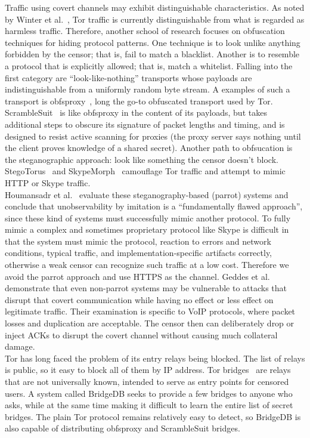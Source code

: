 \documentclass{article}
\begin{document}
Traffic using covert channels may exhibit distinguishable characteristics. As
noted by Winter et al.~\cite{foci12-winter}, Tor traffic is currently
distinguishable from what is regarded as harmless traffic. Therefore, another
school of research focuses on obfuscation techniques for hiding protocol
patterns. One technique is to look unlike anything forbidden by the censor; that
is, fail to match a blacklist. Another is to resemble a protocol that is
explicitly allowed; that is, match a whitelist. Falling into the first category
are ``look-like-nothing'' transports whose payloads are indistinguishable from a
uniformly random byte stream. A examples of such a transport is
obfsproxy~\cite{obfsproxy}, long the go-to obfuscated transport used by Tor.
ScrambleSuit~\cite{scramblesuit} is like obfsproxy in the content of its
payloads, but takes additional steps to obscure its signature of packet lengths
and timing, and is designed to resist active scanning for proxies (the proxy
server says nothing until the client proves knowledge of a shared secret).
Another path to obfsucation is the steganographic approach: look like something
the censor doesn't block. StegoTorus~\cite{stegotorus} and SkypeMorph~\cite{skypemorph} camouflage Tor
traffic and attempt to mimic HTTP or Skype traffic.\\

Houmansadr et al.~\cite{parrot} evaluate these steganography-based (parrot)
systems and conclude that unobservability by imitation is a ``fundamentally
flawed approach'', since these kind of systems must successfully mimic another
protocol. To fully mimic a complex and sometimes proprietary protocol like Skype
is difficult in that the system must mimic the protocol,  reaction to errors and
network conditions, typical traffic, and implementation-specific artifacts
correctly, otherwise a weak censor can recognize such traffic at a low cost.
Therefore we avoid the parrot approach and use HTTPS as the channel. Geddes  et
al.~\cite{acks} demonstrate that even non-parrot systems may be vulnerable to
attacks that disrupt that covert communication while having no effect or less
effect on legitimate traffic. Their examination is specific to VoIP protocols,
where packet losses and duplication are acceptable. The censor then can
deliberately drop or inject ACKs to disrupt the covert channel without causing
much collateral damage.\\

Tor has long faced the problem of its entry relays being blocked. The list of
relays is public, so it easy to block all of them by IP address. Tor
bridges~\cite{tor-blocking} are relays that are not universally known, intended
to serve as entry points for censored users. A system called BridgeDB seeks to
provide a few bridges to anyone who asks, while at the same time making it
difficult to learn the entire list of secret bridges. The plain Tor protocol
remains relatively easy to detect, so BridgeDB is also capable of distributing
obfsproxy and ScrambleSuit bridges.\\
\end{document}
